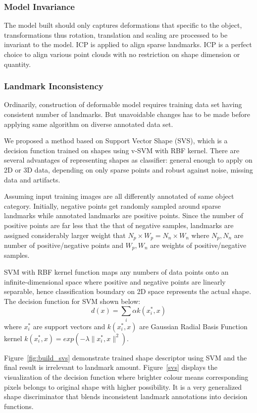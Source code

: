 \subsubsection{Model Invariance}
The model built should only captures deformations that specific to the object, transformations thus rotation, translation and scaling are processed to be invariant to the model\cite{?}. ICP is applied to align sparse landmarks. ICP is a perfect choice to align various point clouds with no restriction on shape dimension or quantity.

\subsubsection{Landmark Inconsistency}
Ordinarily, construction of deformable model requires training data set having consistent number of landmarks. But unavoidable changes has to be made before applying same algorithm on diverse annotated data set. 

We proposed a method based on Support Vector Shape (SVS)\cite{?}, which is a decision function trained on shapes using v-SVM with RBF kernel. There are several advantages of representing shapes as classifier: general enough to apply on 2D or 3D data, depending on only sparse points and robust against noise, missing data and artifacts. 

Assuming input training images are all differently annotated of same object category. Initially, negative points get randomly sampled around sparse landmarks while annotated landmarks are positive points. Since the number of positive points are far less that the that of negative samples, landmarks are assigned considerably larger weight that $N_p \times W_p=N_n \times W_n$ where $N_p, N_n$ are number of positive/negative points and $W_p, W_n$ are weights of positive/negative samples. 

SVM with RBF kernel function maps any numbers of data points onto an infinite-dimensional space where positive and negative points are linearly separable, hence classification boundary on 2D space represents the actual shape. The decision function for SVM shown below:
\begin{equation} \label{eq:decisionfunc}
    d(x)=\sum_i\alpha k(x_i^*,x)
\end{equation}
where $x_i^*$ are support vectors and $k(x_i^*,x)$ are Gaussian Radial Basis Function kernel $k(x_i^*,x)=exp(-\lambda \|x_i^*,x\|^2)$.

Figure~\ref{fig:build_svs} demonstrate trained shape descriptor using SVM and the final result is irrelevant to landmark amount. Figure~\ref{svs} displays the visualization of the decision function where brighter colour means corresponding pixels belongs to original shape with higher possibility. It is a very generalized shape discriminator that blends inconsistent landmark annotations into decision functions. 


